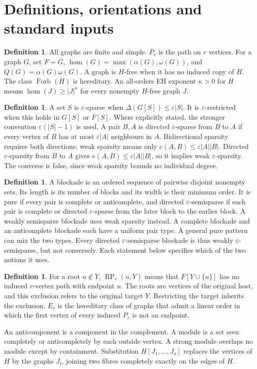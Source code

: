 \documentclass[11pt,a4paper]{article}
\theoremstyle{definition}
\newtheorem{definition}[theorem]{Definition}
\theoremstyle{remark}
\numberwithin{equation}{section}
\DeclareMathOperator{\Forb}{Forb}
\DeclareMathOperator{\RP}{RP}
\begin{document}
\section{Definitions, orientations and standard inputs}\label{sec:notation}
\begin{definition}
All graphs are finite and simple. \(P_r\) is the path on \(r\) vertices. For a graph \(G\), set \(F=\overline G\), \(\hom(G)=\max(\alpha(G),\omega(G))\), and \(Q(G)=\alpha(G)\omega(G)\). A graph is \(H\)-free when it has no induced copy of \(H\). The class \(\Forb(H)\) is hereditary. An all-orders EH exponent \(\kappa>0\) for \(H\) means \(\hom(J)\ge |J|^\kappa\) for every nonempty \(H\)-free graph \(J\).
\end{definition}
\begin{definition}
A set \(S\) is \(\varepsilon\)-sparse when \(\Delta(G[S])\le\varepsilon|S|\). It is \(\varepsilon\)-restricted when this holds in \(G[S]\) or \(F[S]\). Where explicitly stated, the stronger convention \(\varepsilon(|S|-1)\) is used. A pair \(B,A\) is directed \(\varepsilon\)-sparse from \(B\) to \(A\) if every vertex of \(B\) has at most \(\varepsilon|A|\) neighbours in \(A\). Bidirectional sparsity requires both directions; weak sparsity means only \(e(A,B)\le\varepsilon|A||B|\). Directed \(\varepsilon\)-sparsity from \(B\) to \(A\) gives \(e(A,B)\le\varepsilon|A||B|\), so it implies weak \(\varepsilon\)-sparsity. The converse is false, since weak sparsity bounds no individual degree.
\end{definition}
\begin{definition}
A blockade is an ordered sequence of pairwise disjoint nonempty sets. Its length is its number of blocks and its width is their minimum order. It is pure if every pair is complete or anticomplete, and directed \(\varepsilon\)-semisparse if each pair is complete or directed \(\varepsilon\)-sparse from the later block to the earlier block. A weakly semisparse blockade uses weak sparsity instead. A complete blockade and an anticomplete blockade each have a uniform pair type. A general pure pattern can mix the two types. Every directed \(\varepsilon\)-semisparse blockade is thus weakly \(\varepsilon\)-semisparse, but not conversely. Each statement below specifies which of the two notions it uses.
\end{definition}
\begin{definition}
For a root \(u\notin Y\), \(\RP_r(u,Y)\) means that \(F[Y\cup\{u\}]\) has no induced \(r\)-vertex path with endpoint \(u\). The roots are vertices of the original host, and this exclusion refers to the original target \(Y\). Restricting the target inherits the exclusion. \(E_r\) is the hereditary class of graphs that admit a linear order in which the first vertex of every induced \(P_r\) is not an endpoint.
\end{definition}
An anticomponent is a component in the complement. A module is a set seen completely or anticompletely by each outside vertex. A strong module overlaps no module except by containment. Substitution \(H[J_1,\ldots,J_a]\) replaces the vertices of \(H\) by the graphs \(J_i\), joining two fibres completely exactly on the edges of \(H\).
\end{document}
